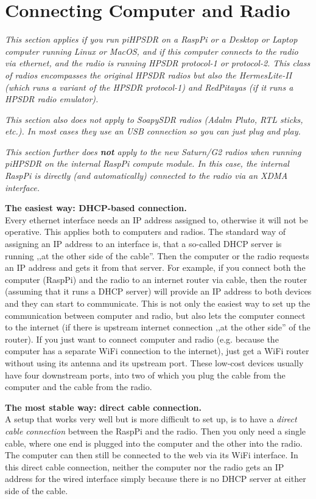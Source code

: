 \documentclass[12pt]{book}
\def\pH{pi\-HPSDR\xspace}
\begin{document}
\chapter[Connecting the Computer and the Radio]{Connecting Computer and Radio}
\label{sec:dhcp}
\textit{This section applies if you run \pH on a
RaspPi or a Desktop or Laptop computer running Linux or MacOS, and if this computer connects to the
radio via ethernet, and the radio is running HPSDR protocol-1 or protocol-2. This class of radios
encompasses the original HPSDR radios but also the HermesLite-II (which runs a variant of the HPSDR
protocol-1) and RedPitayas (if it runs a HPSDR radio emulator).}

\textit{This section also does not apply to SoapySDR radios (Adalm Pluto, RTL sticks, etc.). In most
cases they use an USB connection so you can just plug and play.}

\textit{This section further does \textbf{not} apply to the new Saturn/G2 radios when running \pH on the
internal RaspPi compute module. In this case, the internal RaspPi
is directly (and automatically) connected to the radio via an XDMA interface.}


\textbf{The easiest way: DHCP-based connection.}\\
Every ethernet interface needs an IP address assigned to, otherwise it will not be operative. This applies
both to computers and radios. The standard way of assigning an IP address to an interface is, that
a so-called DHCP server is running ,,at the other side of the cable''. Then the computer or the radio
requests an IP address and gets it from that server. For example, if you connect both the computer (RaspPi)
and the radio to an internet router via cable, then the router (assuming that it runs a DHCP server)
will provide an IP address to both devices and they can start to communicate. This is not only the
easiest way to set up the communication between computer and radio, but also lets the computer connect
to the internet (if there is upstream internet connection ,,at the other side'' of the router).
If you just want to connect computer and radio (e.g. because the computer has a separate WiFi connection
to the internet), just get a WiFi router without using its antenna and its upstream port. These low-cost
devices usually have four downstream ports, into two of which you plug the cable from the computer and
the cable from the radio.

\textbf{The most stable way: direct cable connection.}\\
A setup that works very well but is more difficult to set up,
 is to have a \textit{direct cable connection} between the RaspPi and the radio. Then you
 only need a single cable,  where one end is plugged into the computer and the other into the radio. The computer
can then still be connected to the web via its WiFi interface. In this direct cable connection, neither
the computer nor the radio gets an IP address for the wired interface simply because there is no DHCP server
at either side of the cable.
\end{document}

